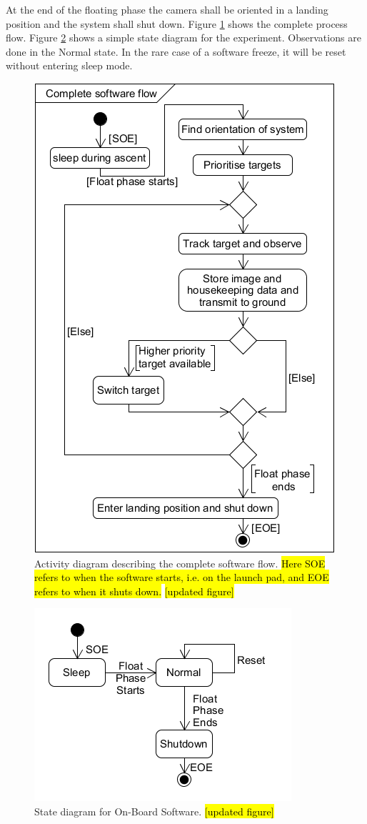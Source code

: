 At the end of the floating phase the camera shall be oriented in a landing position and the system shall shut down. Figure \ref{fig:software-activity-diagram} shows the complete process flow. Figure \ref{fig:software-state-diagram} shows a simple state diagram for the experiment. Observations are done in the Normal state. In the rare case of a software freeze, it will be reset without entering sleep mode.

\begin{figure}[H]
    \centering
    \includegraphics[width=.5\textwidth]{4-experiment-design/img/software/activity-diagram.png}
    \caption{Activity diagram describing the complete software flow. \hl{Here SOE refers to when the software starts, i.e. on the launch pad, and EOE refers to when it shuts down.} \hl{[updated figure]}}
    \label{fig:software-activity-diagram}
\end{figure}

\begin{figure}[H]
	\centering
	\includegraphics[width=.5\textwidth]{4-experiment-design/img/software/state-diagram.png}
	\caption{State diagram for On-Board Software. \hl{[updated figure]}}
	\label{fig:software-state-diagram}
\end{figure}

